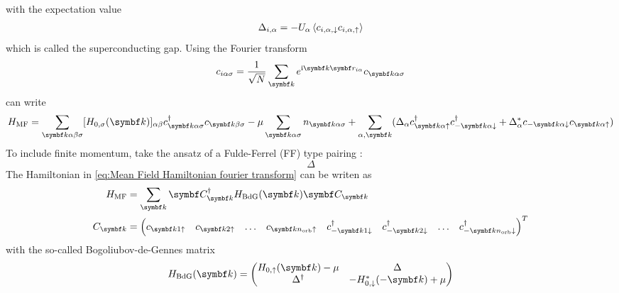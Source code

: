 \documentclass[../notes.tex]{subfiles}
\begin{document}
with the expectation value
\begin{align}
	\Delta_{i, \alpha} = -U_{\alpha} \braket{c_{i, \alpha, \downarrow} c_{i, \alpha, \uparrow}}
\end{align}
which is called the superconducting gap.
Using the Fourier transform
\begin{equation}
	c_{i \alpha \sigma} = \frac{1}{\sqrt{N}} \sum_{\vb{k}} e^{\iu \vb{k} \vb{r}_{i \alpha}} c_{\vb{k} \alpha \sigma}
\end{equation}
can write 
\begin{align}
	H_{\mathrm{MF}} = \sum_{\vb{k} \alpha \beta \sigma} [H_{0, \sigma} (\vb{k})]_{\alpha \beta} c_{\vb{k} \alpha \sigma}^{\dagger} c_{\vb{k} \beta \sigma}
	-\mu \sum_{\vb{k} \alpha \sigma} n_{\vb{k} \alpha \sigma}
	+ \sum_{\alpha, \vb{k}} (\Delta_{\alpha} c_{\vb{k} \alpha \uparrow}^{\dagger} c_{-\vb{k} \alpha \downarrow}^{\dagger} + \Delta_{\alpha}^* c_{-\vb{k} \alpha \downarrow} c_{\vb{k} \alpha \uparrow})
	\label{eq:Mean Field Hamiltonian fourier transform}
\end{align}
To include finite momentum, take the ansatz of a Fulde-Ferrel (FF) type pairing \cite{kinnunenFuldeFerrellLarkin2018}:  
\begin{equation}
	\Delta
\end{equation}
The Hamiltonian in \cref{eq:Mean Field Hamiltonian fourier transform} can be writen as 
\begin{align}
	H_{\mathrm{MF}} &= \sum_{\vb{k}} \vb{C}_{\vb{k}}^{\dagger} H_{\mathrm{BdG}} (\vb{k}) \vb{C}_{\vb{k}} \\
	C_{\vb{k}} &= 
		\begin{pmatrix}
			c_{\vb{k} 1 \uparrow} & 
			c_{\vb{k} 2 \uparrow} &
			\ldots &
			c_{\vb{k} n_{\mathrm{orb}} \uparrow} &
			c_{-\vb{k} 1 \downarrow}^{\dagger} &
			c_{-\vb{k} 2 \downarrow}^{\dagger} &
			\ldots &
			c_{-\vb{k} n_{\mathrm{orb}} \downarrow}^{\dagger}
		\end{pmatrix}^{T}
\end{align}
with the so-called Bogoliubov-de-Gennes matrix
\begin{equation}
	H_{\mathrm{BdG}} (\vb{k}) =
	\begin{pmatrix}
		H_{0, \uparrow} (\vb{k}) - \mu & \Delta \\
		\Delta^{\dagger} & - H_{0, \downarrow}^* (-\vb{k}) + \mu
	\end{pmatrix}
\end{equation}
\end{document}
